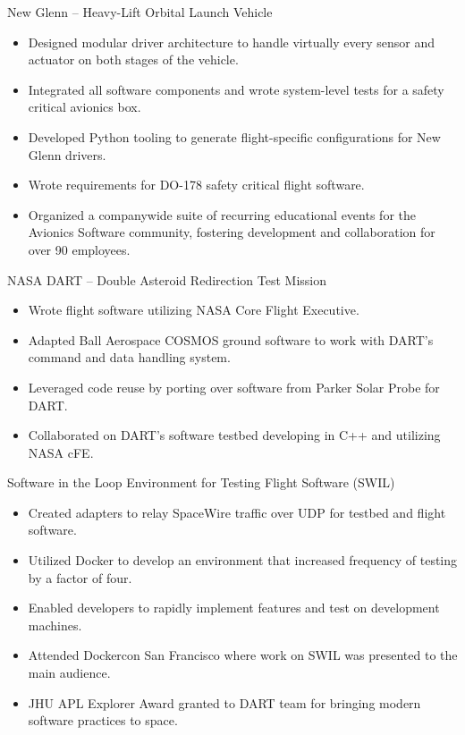 \documentclass[10pt,final,sans]{resume}
\begin{document}
New Glenn -- Heavy-Lift Orbital Launch Vehicle
\begin{itemize}
  \item Designed modular driver architecture to handle virtually every sensor and actuator on both stages of the vehicle.
  \item Integrated all software components and wrote system-level tests for a safety critical avionics box.
  \item Developed Python tooling to generate flight-specific configurations for New Glenn drivers.
  \item Wrote requirements for DO-178 safety critical flight software.
  \item Organized a companywide suite of recurring educational events for the Avionics Software community, fostering development and collaboration for over 90 employees.
\end{itemize}
NASA DART -- Double Asteroid Redirection Test Mission
\begin{itemize}
  \item Wrote flight software utilizing NASA Core Flight Executive.
  \item Adapted Ball Aerospace COSMOS ground software to work with DART's command and data handling system.
  \item Leveraged code reuse by porting over software from Parker Solar Probe for DART.
  \item Collaborated on DART's software testbed developing in C++ and utilizing NASA cFE.
\end{itemize} 
Software in the Loop Environment for Testing Flight Software (SWIL)
\begin{itemize}
  \item Created adapters to relay SpaceWire traffic over UDP for testbed and flight software.
  \item Utilized Docker to develop an environment that increased frequency of testing by a factor of four.
  \item Enabled developers to rapidly implement features and test on development machines.
  \item Attended Dockercon San Francisco where work on SWIL was presented to the main audience.
  \item JHU APL Explorer Award granted to DART team for bringing modern software practices to space.
\end{itemize}
\end{document}
